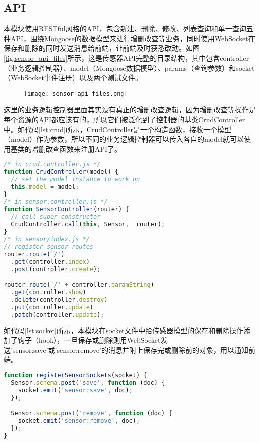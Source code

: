 \subsection{API}
本模块使用RESTful风格的API，包含新建、删除、修改、列表查询和单一查询五种API，围绕Mongoose的数据模型来进行增删改查等业务，同时使用WebSocket在保存和删除的同时发送消息给前端，让前端及时获悉改动。如图\ref{fig:sensor_api_files}所示，这是传感器API完整的目录结构，其中包含controller（业务逻辑控制器）、model（Mongoose数据模型）、params（查询参数）和socket（WebSocket事件注册）以及两个测试文件。
\begin{figure}[H]
 \centering
 \texttt{[image: sensor\_api\_files.png]}
\end{figure}
这里的业务逻辑控制器里面其实没有真正的增删改查逻辑，因为增删改查等操作是每个资源的API都应该有的，所以它们被泛化到了控制器的基类CrudController中。如代码\ref{lst:crud}所示，CrudController是一个构造函数，接收一个模型（model）作为参数，所以不同的业务逻辑控制器可以传入各自的model就可以使用基类的增删改查函数来注册API了。
\begin{lstlisting}[language={JavaScript}, label={lst:crud}, caption={传感器API定义}]
/* in crud.controller.js */
function CrudController(model) {
  // set the model instance to work on
  this.model = model;
}
/* in sensor.controller.js */
function SensorController(router) {
  // call super constructor
  CrudController.call(this, Sensor,  router);
}
/* in sensor/index.js */
// register sensor routes
router.route('/')
  .get(controller.index)
  .post(controller.create);

router.route('/' + controller.paramString)
  .get(controller.show)
  .delete(controller.destroy)
  .put(controller.update)
  .patch(controller.update);
\end{lstlisting}

如代码\ref{lst:socket}所示，本模块在socket文件中给传感器模型的保存和删除操作添加了钩子（hook），一旦保存或删除则用WebSocket发送'sensor:save'或'sensor:remove'的消息并附上保存完或删除前的对象，用以通知前端。
\begin{lstlisting}[language={JavaScript}, label={lst:socket}, caption={传感器资源的Socket注册函数}]
function registerSensorSockets(socket) {
  Sensor.schema.post('save', function (doc) {
    socket.emit('sensor:save', doc);
  });

  Sensor.schema.post('remove', function (doc) {
    socket.emit('sensor:remove', doc);
  });
}
\end{lstlisting}

